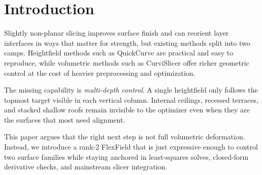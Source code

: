 \section{Introduction}

Slightly non-planar slicing improves surface finish and can reorient layer interfaces in ways that matter for strength, but existing methods split into two camps. Heightfield methods such as QuickCurve are practical and easy to reproduce, while volumetric methods such as CurviSlicer offer richer geometric control at the cost of heavier preprocessing and optimization.

The missing capability is \emph{multi-depth control}. A single heightfield only follows the topmost target visible in each vertical column. Internal ceilings, recessed terraces, and stacked shallow roofs remain invisible to the optimizer even when they are the surfaces that most need alignment.

This paper argues that the right next step is not full volumetric deformation. Instead, we introduce a rank-2 FlexField that is just expressive enough to control two surface families while staying anchored in least-squares solves, closed-form derivative checks, and mainstream slicer integration.
